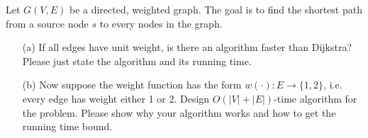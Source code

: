 \noindent {} 
Let $G(V, E)$ be a directed, weighted graph. The goal is to find the shortest path from a source node $s$ to every nodes in the graph.
\begin{itemize}
    \item[(a)] If all edges have unit weight, is there an algorithm faster than Dijkstra? Please just state the algorithm and its running time. \\
    \item[(b)] Now suppose the weight function has the form $w(\cdot) : E \rightarrow \{1, 2\}$, i.e. every edge has weight either 1 or 2. Design $O(|V | + |E|)$-time algorithm for the problem. Please show why your algorithm works and how to get the running time bound. \\
\end{itemize}

